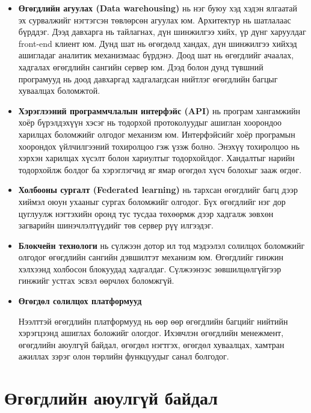 \begin{itemize}
    \item \textbf{Өгөгдлийн агуулах (Data warehousing)} нь нэг буюу хэд хэдэн ялгаатай эх сурвалжийг нэгтэгсэн төвлөрсөн агуулах юм. Архитектур нь шатлалаас бүрддэг. Дээд давхарга нь тайлагнах, дүн шинжилгээ хийх, үр дүнг харуулдаг front-end клиент юм. Дунд шат нь өгөгдөлд хандах, дүн шинжилгээ хийхэд ашигладаг аналитик механизмаас бүрдэнэ. Доод шат нь өгөгдлийг ачаалах, хадгалах өгөгдлийн сангийн сервер юм. Дээд болон дунд түвшний програмууд нь доод давхаргад хадгалагдсан нийтлэг өгөгдлийн багцыг хуваалцах боломжтой.
    
    \item \textbf{Хэрэглээний программчлалын интерфэйс (API)} нь програм хангамжийн хоёр бүрэлдэхүүн хэсэг нь тодорхой протоколуудыг ашиглан хоорондоо харилцах боломжийг олгодог механизм юм. Интерфэйсийг  хоёр програмын хоорондох үйлчилгээний тохиролцоо гэж үзэж болно. Энэхүү тохиролцоо нь хэрхэн харилцах хүсэлт болон хариултыг тодорхойлдог. Хандалтыг нарийн тодорхойлж болдог ба хэрэглэгчид яг ямар өгөгдөл хүсч болохыг зааж өгдөг.
    
    \item \textbf{Холбооны сургалт (Federated learning)} нь тархсан өгөгдлийг багц дээр хиймэл оюун ухааныг сургах боломжийг олгодог. Бүх өгөгдлийг нэг дор цуглуулж нэгтэхийн оронд тус тусдаа төхөөрмж дээр хадгалж зөвхөн загварийн шинэчлэлтүүдийг төв сервер рүү илгээдэг.

    \item \textbf{Блокчейн технологи} нь сүлжээн дотор ил тод мэдээлэл солилцох боломжийг олгодог өгөгдлийн сангийн дэвшилтэт механизм юм. Өгөгдлийг гинжин хэлхээнд холбосон блокуудад хадгалдаг. Сүлжээнээс зөвшилцөлгүйгээр гинжийг устгах эсвэл өөрчлөх боломжгүй.

    \item \textbf{Өгөгдөл солилцох платформууд}
    
    Нээлттэй өгөгдлийн платформууд нь өөр өөр өгөгдлийн багцийг нийтийн хэрэгцээнд ашиглах боложийг ологдог. Ихэвчлэн өгөгдлийн менежмент, өгөгдлийн аюулгүй байдал, өгөгдөл нэгтгэх, өгөгдөл хуваалцах, хамтран ажиллах зэрэг олон төрлийн функцуудыг санал болгодог.
\end{itemize}


\section{Өгөгдлийн аюулгүй байдал}

